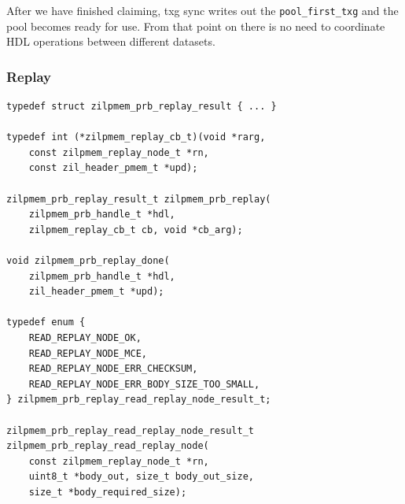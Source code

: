 \documentclass[12pt,a4paper,twoside]{book}
\begin{document}
After we have finished claiming, txg sync writes out the \lstinline{pool_first_txg} and the pool becomes ready for use.
From that point on there is no need to coordinate HDL operations between different datasets.


\subsubsection{Replay}\label{di:prb:api:replay}

\begin{lstlisting}
typedef struct zilpmem_prb_replay_result { ... }

typedef int (*zilpmem_replay_cb_t)(void *rarg,
    const zilpmem_replay_node_t *rn,
    const zil_header_pmem_t *upd);

zilpmem_prb_replay_result_t zilpmem_prb_replay(
    zilpmem_prb_handle_t *hdl,
    zilpmem_replay_cb_t cb, void *cb_arg);

void zilpmem_prb_replay_done(
    zilpmem_prb_handle_t *hdl,
    zil_header_pmem_t *upd);

typedef enum {
	READ_REPLAY_NODE_OK,
	READ_REPLAY_NODE_MCE,
	READ_REPLAY_NODE_ERR_CHECKSUM,
	READ_REPLAY_NODE_ERR_BODY_SIZE_TOO_SMALL,
} zilpmem_prb_replay_read_replay_node_result_t;

zilpmem_prb_replay_read_replay_node_result_t
zilpmem_prb_replay_read_replay_node(
    const zilpmem_replay_node_t *rn,
    uint8_t *body_out, size_t body_out_size,
    size_t *body_required_size);
\end{lstlisting}
\end{document}
